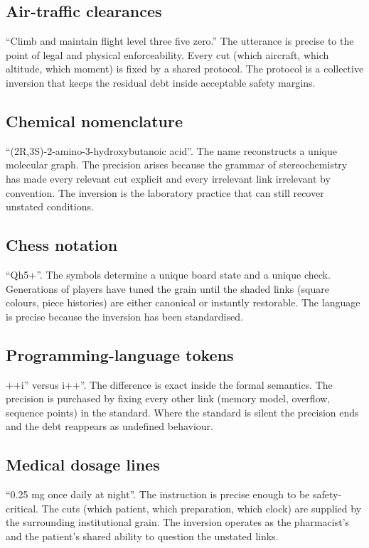 \documentclass[11pt,a4paper]{article}
\begin{document}
\subsection{Air-traffic clearances} ``Climb and maintain flight level three five zero.'' The utterance is precise to the point of legal and physical enforceability. Every cut (which aircraft, which altitude, which moment) is fixed by a shared protocol. The protocol is a collective inversion that keeps the residual debt inside acceptable safety margins.

\subsection{Chemical nomenclature} ``(2R,3S)-2-amino-3-hydroxybutanoic acid''. The name reconstructs a unique molecular graph. The precision arises because the grammar of stereochemistry has made every relevant cut explicit and every irrelevant link irrelevant by convention. The inversion is the laboratory practice that can still recover unstated conditions.

\subsection{Chess notation} ``Qh5+''. The symbols determine a unique board state and a unique check. Generations of players have tuned the grain until the shaded links (square colours, piece histories) are either canonical or instantly restorable. The language is precise because the inversion has been standardised.

\subsection{Programming-language tokens} ++i'' versus i++''. The difference is exact inside the formal semantics. The precision is purchased by fixing every other link (memory model, overflow, sequence points) in the standard. Where the standard is silent the precision ends and the debt reappears as undefined behaviour.

\subsection{Medical dosage lines} ``0.25 mg once daily at night''. The instruction is precise enough to be safety-critical. The cuts (which patient, which preparation, which clock) are supplied by the surrounding institutional grain. The inversion operates as the pharmacist’s and the patient’s shared ability to question the unstated links.
\end{document}
